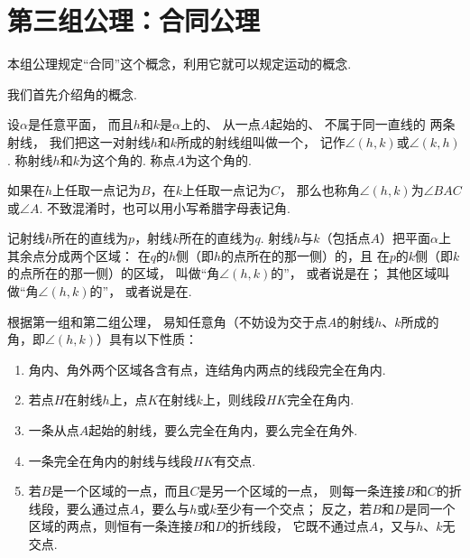 \section{第三组公理：合同公理}
本组公理规定“合同”这个概念，利用它就可以规定运动的概念.

我们首先介绍角的概念.
\begin{definition}\label{definition:欧氏几何.几何元素.角}
设\(\alpha\)是任意平面，
而且\(h\)和\(k\)是\(\alpha\)上的、%
从一点\(A\)起始的、%
不属于同一直线的%
两条射线，
我们把这一对射线\(h\)和\(k\)所成的射线组叫做一个，
记作\(\angle(h,k)\)或\(\angle(k,h)\).
称射线\(h\)和\(k\)为这个角的.
称点\(A\)为这个角的.

如果在\(h\)上任取一点记为\(B\)，在\(k\)上任取一点记为\(C\)，
那么也称角\(\angle(h,k)\)为\(\angle BAC\)或\(\angle A\).
不致混淆时，也可以用小写希腊字母表记角.

记射线\(h\)所在的直线为\(p\)，射线\(k\)所在的直线为\(q\).
射线\(h\)与\(k\)（包括点\(A\)）把平面\(\alpha\)上其余点分成两个区域：
在\(q\)的\(h\)侧（即\(h\)的点所在的那一侧）的，且%
在\(p\)的\(k\)侧（即\(k\)的点所在的那一侧）的区域，
叫做“角\(\angle(h,k)\)的”，
或者说是在；
其他区域叫做“角\(\angle(h,k)\)的”，
或者说是在.
\end{definition}

\begin{property}
根据第一组和第二组公理，
易知任意角（不妨设为交于点\(A\)的射线\(h\)、\(k\)所成的角，即\(\angle(h,k)\)）具有以下性质：
\begin{enumerate}
\item 角内、角外两个区域各含有点，连结角内两点的线段完全在角内.
\item 若点\(H\)在射线\(h\)上，点\(K\)在射线\(k\)上，则线段\(HK\)完全在角内.
\item 一条从点\(A\)起始的射线，要么完全在角内，要么完全在角外.
\item 一条完全在角内的射线与线段\(HK\)有交点.
\item 若\(B\)是一个区域的一点，而且\(C\)是另一个区域的一点，
则每一条连接\(B\)和\(C\)的折线段，要么通过点\(A\)，要么与\(h\)或\(k\)至少有一个交点；
反之，若\(B\)和\(D\)是同一个区域的两点，则恒有一条连接\(B\)和\(D\)的折线段，
它既不通过点\(A\)，又与\(h\)、\(k\)无交点.
\end{enumerate}
\end{property}


